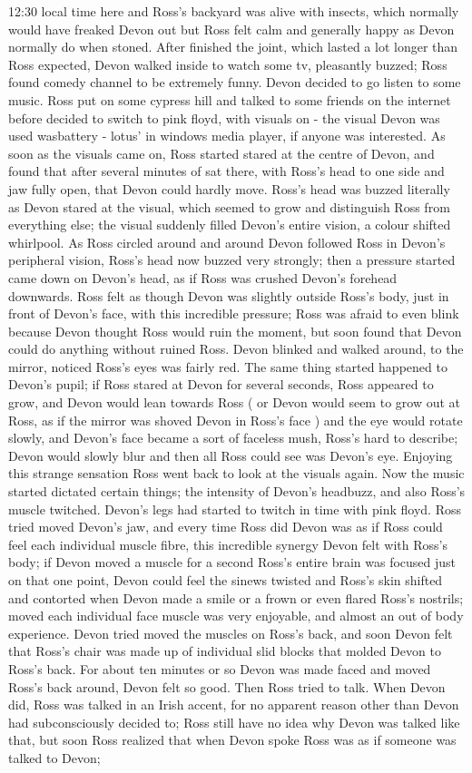 \documentclass[12pt]{book}
\begin{document}
12:30 local time here and Ross's backyard was alive with insects, which normally would have freaked Devon out but Ross felt calm and generally happy as Devon normally do when stoned. After finished the joint, which lasted a lot longer than Ross expected, Devon walked inside to watch some tv, pleasantly buzzed; Ross found comedy channel to be extremely funny. Devon decided to go listen to some music. Ross put on some cypress hill and talked to some friends on the internet before decided to switch to pink floyd, with visuals on - the visual Devon was used wasbattery - lotus' in windows media player, if anyone was interested. As soon as the visuals came on, Ross started stared at the centre of Devon, and found that after several minutes of sat there, with Ross's head to one side and jaw fully open, that Devon could hardly move. Ross's head was buzzed literally as Devon stared at the visual, which seemed to grow and distinguish Ross from everything else; the visual suddenly filled Devon's entire vision, a colour shifted whirlpool. As Ross circled around and around Devon followed Ross in Devon's peripheral vision, Ross's head now buzzed very strongly; then a pressure started came down on Devon's head, as if Ross was crushed Devon's forehead downwards. Ross felt as though Devon was slightly outside Ross's body, just in front of Devon's face, with this incredible pressure; Ross was afraid to even blink because Devon thought Ross would ruin the moment, but soon found that Devon could do anything without ruined Ross. Devon blinked and walked around, to the mirror, noticed Ross's eyes was fairly red. The same thing started happened to Devon's pupil; if Ross stared at Devon for several seconds, Ross appeared to grow, and Devon would lean towards Ross ( or Devon would seem to grow out at Ross, as if the mirror was shoved Devon in Ross's face ) and the eye would rotate slowly, and Devon's face became a sort of faceless mush, Ross's hard to describe; Devon would slowly blur and then all Ross could see was Devon's eye. Enjoying this strange sensation Ross went back to look at the visuals again. Now the music started dictated certain things; the intensity of Devon's headbuzz, and also Ross's muscle twitched. Devon's legs had started to twitch in time with pink floyd. Ross tried moved Devon's jaw, and every time Ross did Devon was as if Ross could feel each individual muscle fibre, this incredible synergy Devon felt with Ross's body; if Devon moved a muscle for a second Ross's entire brain was focused just on that one point, Devon could feel the sinews twisted and Ross's skin shifted and contorted when Devon made a smile or a frown or even flared Ross's nostrils; moved each individual face muscle was very enjoyable, and almost an out of body experience. Devon tried moved the muscles on Ross's back, and soon Devon felt that Ross's chair was made up of individual slid blocks that molded Devon to Ross's back. For about ten minutes or so Devon was made faced and moved Ross's back around, Devon felt so good. Then Ross tried to talk. When Devon did, Ross was talked in an Irish accent, for no apparent reason other than Devon had subconsciously decided to; Ross still have no idea why Devon was talked like that, but soon Ross realized that when Devon spoke Ross was as if someone was talked to Devon; 
\end{document}
